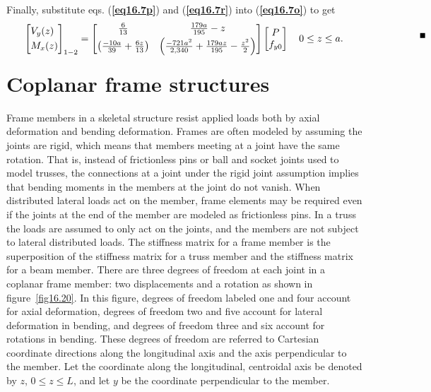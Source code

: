 \documentclass{AeroStructure-ERJohnson}
\begin{document}
\begin{example*}
Finally, substitute eqs. (\textbf{\ref{eq16.7p}}) and (\textbf{\ref{eq16.7r}}) into (\textbf{\ref{eq16.7o}}) to get
\begin{align*}
\left[\begin{array}{@{}l@{}}V_{y}(z) \\[3pt]M_{x}(z)\end{array}\right]_{1-2}=\left[\begin{array}{@{}cc@{}}\frac{6}{13} & \frac{179 a}{195}-z \\[3pt]\left(\frac{-10 a}{39}+\frac{6 z}{13}\right)&\left(\frac{-721 a^{2}}{2,340}+\frac{179 a z}{195}-\frac{z^{2}}{2}\right)\end{array}\right]\left[\begin{array}{@{}c@{}}P \\f_{y 0}\end{array}\right] \quad 0 \leq z \leq a. \\[-2.5pc]
\text{\hfill\qed\hspace*{-83pt}}
\end{align*}
\end{example*}

\vspace*{-1pc}

\section{Coplanar frame structures}\label{sec16.3}

Frame members in a skeletal structure resist applied loads both by axial deformation and bending deformation. Frames are often modeled by assuming the joints are rigid, which means that members meeting at a joint have the same rotation. That is, instead of frictionless pins or ball and socket joints used to model trusses, the connections at a joint under the rigid joint assumption implies that bending moments in the members at the joint do not vanish. When distributed lateral loads act on the member, frame elements may be required even if the joints at the end of the member are modeled as frictionless pins. In a truss the loads are assumed to only act on the joints, and the members are not subject to lateral distributed loads. The stiffness matrix for a frame member is the superposition of the stiffness matrix for a truss member and the stiffness matrix for a beam member. There are three degrees of freedom at each joint in a coplanar frame member: two displacements and a rotation as shown in figure~\ref{fig16.20}. In this figure, degrees of freedom labeled one and four account for axial deformation, degrees of freedom two and five account for lateral deformation in bending, and degrees of freedom three and six account for rotations in bending. These degrees of freedom are referred to Cartesian coordinate directions along the longitudinal axis and the axis perpendicular to the member. Let the coordinate along the longitudinal, centroidal axis be denoted by $z$, $0 \leq z \leq L$, and let $y$ be the coordinate perpendicular to the member.
\end{document}
